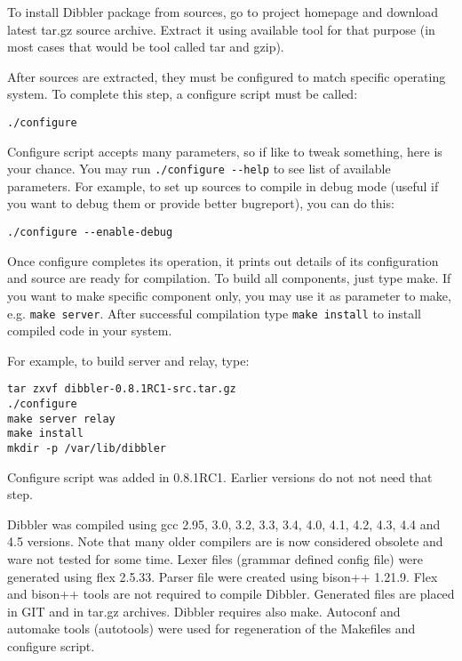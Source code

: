 To install Dibbler package from sources, go to project homepage and
download latest tar.gz source archive. Extract it using available tool
for that purpose (in most cases that would be tool called tar and
gzip).

After sources are extracted, they must be configured to match specific
operating system. To complete this step, a configure script must be
called:
\begin{lstlisting}
./configure
\end{lstlisting}

Configure script accepts many parameters, so if like to tweak
something, here is your chance. You may run \verb+./configure --help+
to see list of available parameters. For example, to set up sources to
compile in debug mode (useful if you want to debug them or provide
better bugreport), you can do this:

\begin{lstlisting}
./configure --enable-debug
\end{lstlisting}

Once configure completes its operation, it prints out details of its
configuration and source are ready for compilation. To build all
components, just type make. If you want to make specific component
only, you may use it as parameter to make, e.g. 
\verb+make server+. After successful compilation type \verb+make install+ to
install compiled code in your system.

For example, to build server and relay, type:

\begin{lstlisting}
tar zxvf dibbler-0.8.1RC1-src.tar.gz
./configure
make server relay
make install
mkdir -p /var/lib/dibbler
\end{lstlisting}

Configure script was added in 0.8.1RC1. Earlier versions do not not
need that step.

Dibbler was compiled using gcc 2.95, 3.0, 3.2, 3.3, 3.4, 4.0, 4.1,
4.2, 4.3, 4.4 and 4.5 versions. Note that many older compilers are is
now considered obsolete and ware not tested for some time. Lexer files
(grammar defined config file) were generated using flex 2.5.33. Parser
file were created using bison++ 1.21.9. Flex and bison++ tools are not
required to compile Dibbler. Generated files are placed in GIT and in
tar.gz archives. Dibbler requires also make. Autoconf and automake
tools (autotools) were used for regeneration of the Makefiles and
configure script.
 
